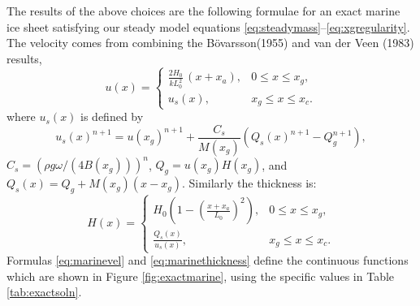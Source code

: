 \documentclass[twocolumn,letterpaper]{igs}
\renewcommand{\dh}{\fontencoding{T1}\selectfont{\symbol{240}}}
\newcommand{\bod}{B\"o\dh varsson\xspace}
\begin{document}
The results of the above choices are the following formulae for an exact marine ice sheet satisfying our steady model equations \eqref{eq:steadymass}--\eqref{eq:xgregularity}.  The velocity comes from combining the \bod (1955) and van der Veen (1983) results,
\begin{equation}
u(x) = \begin{cases} \frac{2 H_0}{k L_0^2}\,(x + x_a), & 0 \le x \le x_g, \\
                     u_s(x), & x_g \le x \le x_c.
       \end{cases} \label{eq:marinevel}
\end{equation}
where $u_s(x)$ is defined by
\begin{equation}
u_s(x)^{n+1} = u(x_g)^{n+1} + \frac{C_s}{M(x_g)} \left(Q_s(x)^{n+1} - Q_g^{n+1}\right), \label{eq:vanderveenvel}
\end{equation}
$C_s = \left(\rho g \omega/(4 B(x_g))\right)^n$, $Q_g = u(x_g) H(x_g)$, and $Q_s(x) = Q_g + M(x_g) (x-x_g)$.  Similarly the thickness is:
\begin{equation}
H(x) = \begin{cases} H_0 \left(1 - (\frac{x+x_a}{L_0})^2\right), & 0 \le x \le x_g, \\
                     \frac{Q_s(x)}{u_s(x)}, & x_g \le x \le x_c.
       \end{cases} \label{eq:marinethickness}
\end{equation}
Formulas \eqref{eq:marinevel} and \eqref{eq:marinethickness} define the continuous functions which are shown in Figure \ref{fig:exactmarine}, using the specific values in Table \ref{tab:exactsoln}.
\end{document}
